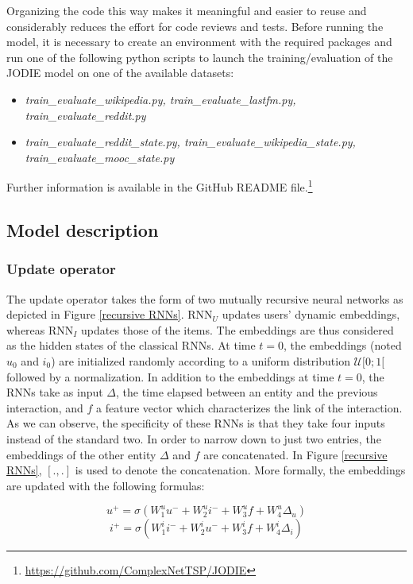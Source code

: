 Organizing the code this way makes it meaningful and easier to reuse and considerably reduces the effort for code reviews and tests. Before running the model, it is necessary to create an environment with the required packages and run one of the following python scripts to launch the training/evaluation of the JODIE model on one of the available datasets:
\begin{itemize}
    \item \textit{train\_evaluate\_wikipedia.py, train\_evaluate\_lastfm.py, train\_evaluate\_reddit.py}
    \item \textit{train\_evaluate\_reddit\_state.py, train\_evaluate\_wikipedia\_state.py, train\_evaluate\_mooc\_state.py}
\end{itemize}
Further information is available in the GitHub README file.\footnote{\url{https://github.com/ComplexNetTSP/JODIE}}

\subsection{Model description}

\subsubsection{Update operator}
The update operator takes the form of two mutually recursive neural networks as depicted in Figure \ref{recursive RNNs}. RNN$_U$ updates users' dynamic embeddings, whereas RNN$_I$ updates those of the items. The embeddings are thus considered as the hidden states of the classical RNNs. At time $t=0$, the embeddings (noted $u_0$ and $i_0$) are initialized randomly according to a uniform distribution $\mathcal{U}[0;1[$ followed by a normalization. In addition to the embeddings at time $t=0$, the RNNs take as input $\Delta$, the time elapsed between an entity and the previous interaction, and $f$ a feature vector which characterizes the link of the interaction. As we can observe, the specificity of these RNNs is that they take four inputs instead of the standard two. In order to narrow down to just two entries, the embeddings of the other entity $\Delta$ and $f$ are concatenated. In Figure \ref{recursive RNNs}, $[.,.]$ is used to denote the concatenation. More formally, the embeddings are updated with the following formulas:

$$
u^+ = \sigma \left ( W_1^u u^- + W_2^u i^- + W_3^u f + W_4^u \Delta_u \right )
$$
$$
i^+ = \sigma \left ( W_1^i i^- + W_2^i u^- + W_3^i f + W_4^i \Delta_i \right )
$$

